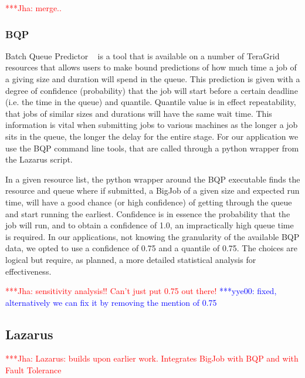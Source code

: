\documentclass[conference,final]{IEEEtran}
\newcommand{\jhanote}[1]{ {\textcolor{red} { ***Jha: #1 }}}
\newcommand{\yyenote}[1]{ {\textcolor{blue} { ***yye00: #1 }}}
\newcommand{\jhanote}[1]{}
\newcommand{\yyenote}[1]{}
\begin{document}
\jhanote{merge..} 
\subsubsection{BQP}
Batch Queue Predictor ~\cite{bqp} is a tool that is available on a
number of TeraGrid resources that allows users to make bound
predictions of how much time a job of a giving size and duration will
spend in the queue.  This prediction is given with a degree of
confidence (probability) that the job will start before a certain
deadline (i.e. the time in the queue) and quantile. Quantile value is
in effect repeatability, that jobs of similar sizes and durations will
have the same wait time. This information is vital when
submitting jobs to various machines as the longer a job sits in the
queue, the longer the delay for the entire stage.  For our application
we use the BQP command line tools, that are called through a python wrapper
from the Lazarus script.

In a given resource list, the python wrapper around the BQP executable
finds the resource and queue where if submitted, a BigJob of a
given size and expected run time, will have a good chance (or high
confidence) of getting through the queue and start running the
earliest. Confidence is in essence the probability that the job will
run, and to obtain a confidence of 1.0, an impractically high queue time is
required. In our applications, not knowing the granularity of the
available BQP data, we opted to use a confidence of 0.75
and a quantile of 0.75. The choices are logical but require, as planned,
a more detailed statistical analysis for effectiveness.

\jhanote{sensitivity analysis!! Can't just put
  0.75 out there!}  \yyenote{fixed, alternatively we can fix it by removing
  the mention of 0.75}
 

\subsection{Lazarus}


\jhanote{Lazarus: builds upon earlier work. Integrates BigJob with BQP
  and with Fault Tolerance}
\end{document}
